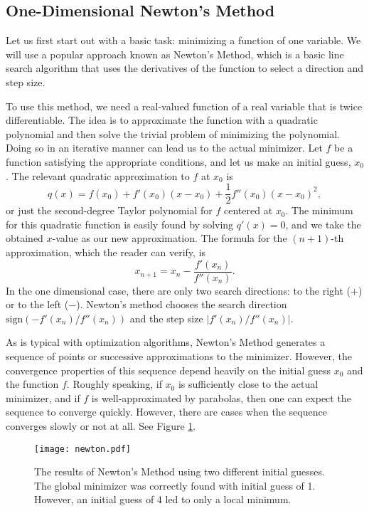 \subsection*{One-Dimensional Newton's Method}
Let us first start out with a basic task: minimizing a function of one variable.
We will use a popular approach known as Newton's Method, which is a basic line search algorithm that uses the derivatives of the function to select a direction and step size.

To use this method, we need a real-valued function of a real variable that is twice differentiable.
The idea is to approximate the function with a quadratic polynomial and then solve the trivial problem of minimizing the polynomial.
Doing so in an iterative manner can lead us to the actual minimizer.
Let $f$ be a function satisfying the appropriate conditions, and let us make an initial guess, $x_0$.
The relevant quadratic approximation to $f$ at $x_0$ is
\begin{equation*}
q(x) = f(x_0) + f'(x_0)(x-x_0) + \frac{1}{2}f''(x_0)(x-x_0)^2,
\end{equation*}
or just the second-degree Taylor polynomial for $f$ centered at $x_0$.
The minimum for this quadratic function is easily found by solving $q'(x) = 0$, and we take the obtained $x$-value as our new approximation.
The formula for the $(n+1)$-th approximation, which the reader can verify, is
\begin{equation*}
x_{n+1} = x_n - \frac{f'(x_n)}{f''(x_n)}.
\end{equation*}
In the one dimensional case, there are only two search directions: to the right ($+$) or to the left ($-$).
Newton's method chooses the search direction $\text{sign}(-f'(x_n)/f''(x_n))$ and the step size $|f'(x_n)/f''(x_n)|$.

As is typical with optimization algorithms, Newton's Method generates a sequence of points or successive approximations to the minimizer.
However, the convergence properties of this sequence depend heavily on the initial guess $x_0$ and the function $f$.
Roughly speaking, if $x_0$ is sufficiently close to the actual minimizer, and if $f$ is well-approximated by parabolas, then one can expect the sequence to converge quickly.
However, there are cases when the sequence converges slowly or not at all.
See Figure \ref{linesearch:newton}.

\begin{figure}
\centering
\texttt{[image: newton.pdf]}
\caption{The results of Newton's Method using two different initial guesses.
The global minimizer was correctly found with initial guess of 1.
However, an initial guess of 4 led to only a local minimum.}
\label{linesearch:newton}
\end{figure}

